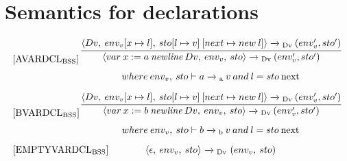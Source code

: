\section{Semantics for declarations}\label{AppSec:SemanticsDeclarations}
\begin{equation}
\begin{minipage}{.2\linewidth}
$[\text{AVARDCL}_\text{BSS}]$
\end{minipage}
\begin{minipage}{.8\linewidth}
\centering
$\cfrac{\langle Dv, \: env_v [x \mapsto l], \: sto[l \mapsto v] \: [next \mapsto new \: l]\rangle \xrightarrow{}\textsubscript{Dv} \: (env_v', sto') }{\langle var \: x:= a \: \textit{newline} \: Dv, \: env_v, \: sto \rangle \xrightarrow{}\textsubscript{Dv} \: (env_v', sto')}$
\[where \: env_v, \: sto \vdash a \xrightarrow{}\textsubscript{a} \: v \: and \: l = sto \: \text{next}\]
\end{minipage}
\end{equation}

\begin{equation}
\begin{minipage}{.2\linewidth}
$[\text{BVARDCL}_\text{BSS}]$
\end{minipage}
\begin{minipage}{.8\linewidth}
\centering
$\cfrac{\langle Dv, \: env_v [x \mapsto l], \: sto[l \mapsto v] \: [next \mapsto new \: l]\rangle \xrightarrow{}\textsubscript{Dv} \: (env_v', sto') }{\langle var \: x:= b \: \textit{newline} \: Dv, \: env_v, \: sto \rangle \xrightarrow{}\textsubscript{Dv} \: (env_v', sto')}$
\[where \: env_v, \: sto \vdash b \xrightarrow{}\textsubscript{b} \: v \: and \: l = sto \: \text{next}\]
\end{minipage}
\end{equation}

\begin{equation}
\begin{minipage}{.2\linewidth}
$[\text{EMPTYVARDCL}_\text{BSS}]$
\end{minipage}
\begin{minipage}{.8\linewidth}
\centering
$\langle \epsilon, \: env_v, \: sto \rangle$ $\xrightarrow{}\textsubscript{\text{Dv}}$ $(env_v, \: sto)$
\end{minipage}
\end{equation}

